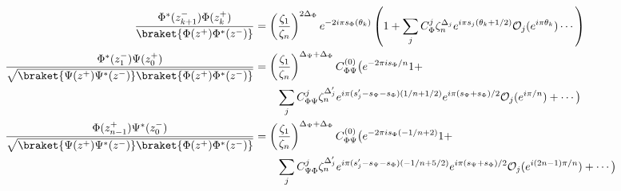 \documentclass[11pt]{article}
\newcommand{\mO}{\mathcal{O}}
\newcommand{\nn}{\nonumber}
\newcommand{\lb}{\left(}
\newcommand{\rb}{\right)}
\begin{document}
  \begin{align}\label{eq: general OPE with identity}
      \frac{\Phi^*(z_{k+1}^{-})\Phi(z_k^+)}{\braket{\Phi(z^+)\Phi^*(z^-)}}&=\lb\frac{\zeta_1}{\zeta_n}\rb^{2\Delta_{\Phi}}  e^{-2i\pi s_\Phi(\theta_k)}\lb 1+ \sum_j C^{j}_{\Phi}\zeta_n^{\Delta_j} e^{i\pi s_j(\theta_k+1/2)}\mO_{j}(e^{i\pi \theta_k})\cdots\rb\nn\\
      \frac{\Phi^*(z_{1}^{-})\Psi(z_0^{+})}{\sqrt{\braket{\Psi(z^+)\Psi^*(z^-)}\braket{\Phi(z^+)\Phi^*(z^-)}}}&=\lb\frac{\zeta_1}{\zeta_n}\rb^{\Delta_\Psi + \Delta_\Phi} C^{(0)}_{\Phi\Psi}\big(  e^{-2\pi i s_\Phi/n}1 +   \nn \\ &\qquad \sum_j C^j_{\Phi\Psi}\zeta_n^{\Delta'_j}e^{i\pi(s'_j - s_\Psi - s_\Phi)(1/n+1/2)}e^{i\pi (s_\Psi + s_\Phi)/2}\mO_j(e^{i\pi/n}) + \cdots\big)\nn \\
      \frac{\Phi(z_{n-1}^{+})\Psi^*(z_0^{-})}{\sqrt{\braket{\Psi(z^+)\Psi^*(z^-)}\braket{\Phi(z^+)\Phi^*(z^-)}}}&= \lb\frac{\zeta_1}{\zeta_n}\rb^{\Delta_\Psi + \Delta_\Phi}C^{(0)}_{\Phi\Psi}  \big(e^{-2\pi i s_{\Phi}(-1/n +2)}1 + \nn\\
      &\qquad \sum_j C^j_{\Psi\Phi}\zeta_n^{\Delta'_j}e^{i\pi(s'_j -s_\Psi - s_\Phi)(-1/n + 5/2)}e^{i \pi (s_\Psi + s_\Phi)/2}\mO_j(e^{i(2n-1)\pi/n}) + \cdots\big)
  \end{align}
\end{document}
